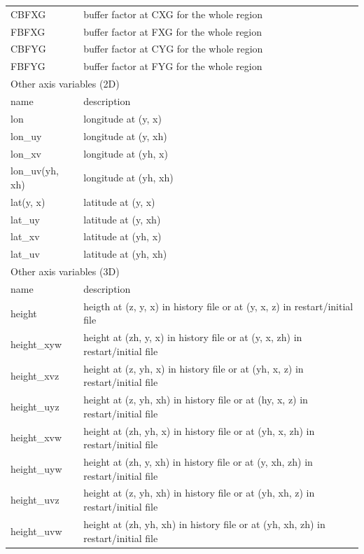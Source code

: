 \begin{longtable}{l|l}
CBFXG & buffer factor at CXG for the whole region \\
FBFXG & buffer factor at FXG for the whole region \\
CBFYG & buffer factor at CYG for the whole region \\
FBFYG & buffer factor at FYG for the whole region \\
\hline
\multicolumn{2}{l}{Other axis variables (2D)}\\ \hline
name & description \\ \hline \hline
lon & longitude at (y, x) \\
lon\_uy & longitude at (y, xh) \\
lon\_xv & longitude at (yh, x) \\
lon\_uv(yh, xh) & longitude at (yh, xh) \\
lat(y, x) & latitude at (y, x) \\
lat\_uy & latitude at (y, xh) \\
lat\_xv & latitude at (yh, x) \\
lat\_uv & latitude at (yh, xh) \\
\hline
\multicolumn{2}{l}{Other axis variables (3D)}\\ \hline
name & description \\ \hline \hline
height & heigth at (z, y, x) in history file or at (y, x, z) in restart/initial file\\
height\_xyw & height at (zh, y, x) in history file or at (y, x, zh) in restart/initial file\\
height\_xvz & height at (z, yh, x) in history file or at (yh, x, z) in restart/initial file\\
height\_uyz & height at (z, yh, xh) in history file or at (hy, x, z) in restart/initial file\\
height\_xvw & height at (zh, yh, x) in history file or at (yh, x, zh) in restart/initial file\\
height\_uyw & height at (zh, y, xh) in history file or at (y, xh, zh) in restart/initial file\\
height\_uvz & height at (z, yh, xh) in history file or at (yh, xh, z) in restart/initial file\\
height\_uvw & height at (zh, yh, xh) in history file or at (yh, xh, zh) in restart/initial file\\
\end{longtable}



